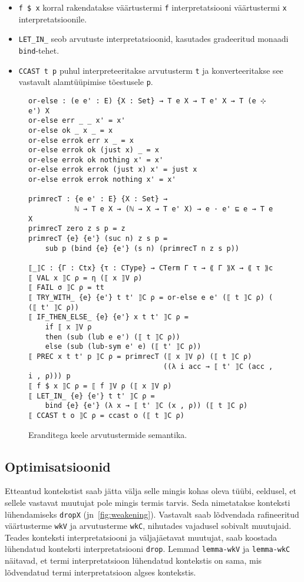 \documentclass[a4paper,12pt]{article}
\begin{document}
\begin{itemize}
\item {\tt f \$ x} korral rakendatakse väärtustermi {\tt f} interpretatsiooni väärtustermi {\tt x} interpretatsioonile.
\item {\tt LET_IN_} seob arvutuste interpretatsioonid, kasutades gradeeritud monaadi {\tt bind}-tehet.
\item {\tt CCAST t p} puhul interpreteeritakse arvutusterm {\tt t} ja konverteeritakse see vastavalt alamtüüpimise tõestusele {\tt p}.
\end{itemize}

\begin{figure}
  \begin{BVerbatim}
or-else : (e e' : E) {X : Set} → T e X → T e' X → T (e ⊹ e') X
or-else err _ _ x' = x'
or-else ok _ x _ = x
or-else errok err x _ = x
or-else errok ok (just x) _ = x
or-else errok ok nothing x' = x'
or-else errok errok (just x) x' = just x
or-else errok errok nothing x' = x'

primrecT : {e e' : E} {X : Set} →
           ℕ → T e X → (ℕ → X → T e' X) → e · e' ⊑ e → T e X
primrecT zero z s p = z
primrecT {e} {e'} (suc n) z s p =
    sub p (bind {e} {e'} (s n) (primrecT n z s p))

⟦_⟧C : {Γ : Ctx} {τ : CType} → CTerm Γ τ → ⟪ Γ ⟫X → ⟪ τ ⟫c
⟦ VAL x ⟧C ρ = η (⟦ x ⟧V ρ)
⟦ FAIL σ ⟧C ρ = tt
⟦ TRY_WITH_ {e} {e'} t t' ⟧C ρ = or-else e e' (⟦ t ⟧C ρ) ( (⟦ t' ⟧C ρ))
⟦ IF_THEN_ELSE_ {e} {e'} x t t' ⟧C ρ =
    if ⟦ x ⟧V ρ
    then (sub (lub e e') (⟦ t ⟧C ρ))
    else (sub (lub-sym e' e) (⟦ t' ⟧C ρ))
⟦ PREC x t t' p ⟧C ρ = primrecT (⟦ x ⟧V ρ) (⟦ t ⟧C ρ)
                                ((λ i acc → ⟦ t' ⟧C (acc , i , ρ))) p
⟦ f $ x ⟧C ρ = ⟦ f ⟧V ρ (⟦ x ⟧V ρ)
⟦ LET_IN_ {e} {e'} t t' ⟧C ρ =
    bind {e} {e'} (λ x → ⟦ t' ⟧C (x , ρ)) (⟦ t ⟧C ρ)
⟦ CCAST t o ⟧C ρ = ccast o (⟦ t ⟧C ρ)
  \end{BVerbatim}
  \caption{Eranditega keele arvutustermide semantika.}
  \label{fig:exc.cterm-semantics}
\end{figure}

\subsection{Optimisatsioonid}\label{ssec:exc.optimizations}

Etteantud kontekstist saab jätta välja selle mingis kohas oleva tüübi, eeldusel, et sellele vastavat muutujat pole mingis termis tarvis.
Seda nimetatakse konteksti lühendamiseks {\tt dropX} (jn~\ref{fig:weakening}).
Vastavalt saab lõdvendada rafineeritud väärtusterme {\tt wkV} ja arvutusterme {\tt wkC}, nihutades vajadusel sobivalt muutujaid.
Teades konteksti interpretatsiooni ja väljajäetavat muutujat, saab koostada lühendatud konteksti interpretatsiooni {\tt drop}.
Lemmad {\tt lemma-wkV} ja {\tt lemma-wkC} näitavad, et termi interpretatsioon lühendatud kontekstis on sama, mis lõdvendatud termi interpretatsioon algses kontekstis.
\end{document}
